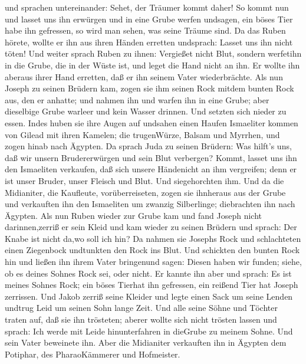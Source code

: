  und sprachen untereinander: Sehet, der Träumer kommt
daher!  So kommt nun und lasset uns ihn erwürgen und in
eine Grube werfen undsagen, ein böses Tier habe ihn gefressen, so wird
man sehen, was seine Träume sind.  Da das Ruben hörete,
wollte er ihn aus ihren Händen erretten undsprach: Lasset uns ihn nicht
töten!  Und weiter sprach Ruben zu ihnen: Vergießet nicht
Blut, sondern werfetihn in die Grube, die in der Wüste ist, und leget
die Hand nicht an ihn. Er wollte ihn aberaus ihrer Hand erretten, daß er
ihn seinem Vater wiederbrächte.  Als nun Joseph zu seinen
Brüdern kam, zogen sie ihm seinen Rock mitdem bunten Rock aus, den er
anhatte;  und nahmen ihn und warfen ihn in eine Grube; aber
dieselbige Grube warleer und kein Wasser drinnen.  Und
setzten sich nieder zu essen. Indes huben sie ihre Augen auf undsahen
einen Haufen Ismaeliter kommen von Gilead mit ihren Kamelen; die
trugenWürze, Balsam und Myrrhen, und zogen hinab nach Ägypten.
 Da sprach Juda zu seinen Brüdern: Was hilft's uns, daß wir
unsern Brudererwürgen und sein Blut verbergen?  Kommt,
lasset uns ihn den Ismaeliten verkaufen, daß sich unsere Händenicht an
ihm vergreifen; denn er ist unser Bruder, unser Fleisch und Blut. Und
siegehorchten ihm.  Und da die Midianiter, die Kaufleute,
vorüberreiseten, zogen sie ihnheraus aus der Grube und verkauften ihn
den Ismaeliten um zwanzig Silberlinge; diebrachten ihn nach Ägypten.
 Als nun Ruben wieder zur Grube kam und fand Joseph nicht
darinnen,zerriß er sein Kleid  und kam wieder zu seinen
Brüdern und sprach: Der Knabe ist nicht da,wo soll ich hin?
 Da nahmen sie Josephs Rock und schlachteten einen
Ziegenbock undtunkten den Rock ins Blut.  Und schickten den
bunten Rock hin und ließen ihn ihrem Vater bringenund sagen: Diesen
haben wir funden; siehe, ob es deines Sohnes Rock sei, oder nicht.
 Er kannte ihn aber und sprach: Es ist meines Sohnes Rock;
ein böses Tierhat ihn gefressen, ein reißend Tier hat Joseph zerrissen.
 Und Jakob zerriß seine Kleider und legte einen Sack um
seine Lenden undtrug Leid um seinen Sohn lange Zeit.  Und
alle seine Söhne und Töchter traten auf, daß sie ihn trösteten; aberer
wollte sich nicht trösten lassen und sprach: Ich werde mit Leide
hinunterfahren in dieGrube zu meinem Sohne. Und sein Vater beweinete
ihn.  Aber die Midianiter verkauften ihn in Ägypten dem
Potiphar, des PharaoKämmerer und Hofmeister.

